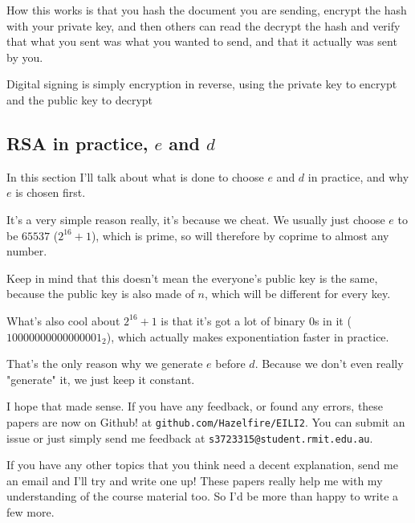 \documentclass{article}
\begin{document}
  How this works is that you hash the document you are sending, encrypt the hash
  with your private key, and then others can read the decrypt the hash and 
  verify that what you sent was what you wanted to send, and that it actually
  was sent by you.

  Digital signing is simply encryption in reverse, using the private key to
  encrypt and the public key to decrypt

  \subsection*{RSA in practice, $e$ and $d$}
  In this section I'll talk about what is done to choose $e$ and $d$ in practice,
  and why $e$ is chosen first.

  It's a very simple reason really, it's because we cheat. We usually just
  choose $e$ to be $65537$ ($2^{16} + 1$), which is prime, so will therefore by coprime to
  almost any number.

  Keep in mind that this doesn't mean the everyone's public key is the same,
  because the public key is also made of $n$, which will be different for
  every key.
  
  What's also cool about $2^{16} + 1$ is that it's got a lot of binary $0$s in it
  ($10000000000000001_2$), which actually makes exponentiation faster in practice.

  That's the only reason why we generate $e$ before $d$. Because we don't even
  really "generate" it, we just keep it constant.

  I hope that made sense. If you have any feedback, or found any errors, these
  papers are now on Github! at \texttt{github.com/Hazelfire/EILI2}. You can
  submit an issue or just simply send me feedback at \texttt{s3723315@student.rmit.edu.au}.

  If you have any other topics that you think need a decent explanation, send
  me an email and I'll try and write one up! These papers really help me with
  my understanding of the course material too. So I'd be more than happy to
  write a few more.
\end{document}
